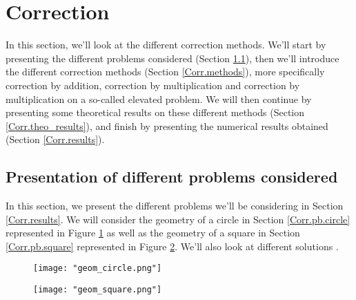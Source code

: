 \section{Correction} \label{Corr}
\graphicspath{{images/corr}}

In this section, we'll look at the different correction methods. We'll start by presenting the different problems considered (Section \ref{Corr.problems}), then we'll introduce the different correction methods (Section \ref{Corr.methods}), more specifically correction by addition, correction by multiplication and correction by multiplication on a so-called elevated problem. We will then continue by presenting some theoretical results on these different methods (Section \ref{Corr.theo_results}), and finish by presenting the numerical results obtained (Section \ref{Corr.results}).

\subsection{Presentation of different problems considered} \label{Corr.problems}

In this section, we present the different problems we'll be considering in Section \ref{Corr.results}. We will consider the geometry of a circle in Section \ref{Corr.pb.circle} represented in Figure \ref{geom_circle} as well as the geometry of a square in Section \ref{Corr.pb.square} represented in Figure \ref{geom_square}. We'll also look at different solutions .

\begin{minipage}{0.48\linewidth}
	\begin{figure}[H]
		\centering
		\texttt{[image: "geom\_circle.png"]}
		\label{geom_circle}
	\end{figure} 
\end{minipage}
\begin{minipage}{0.48\linewidth}
	\begin{figure}[H]
		\centering
		\texttt{[image: "geom\_square.png"]}
		\label{geom_square}
	\end{figure} 
\end{minipage}

